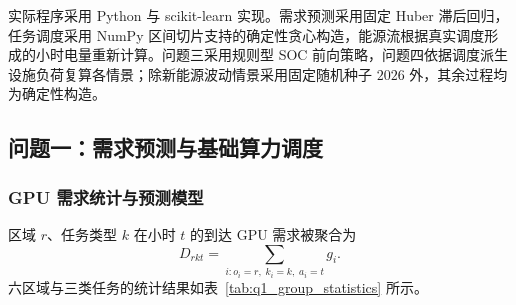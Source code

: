 
实际程序采用 Python 与 scikit-learn 实现。需求预测采用固定 Huber 滞后回归，任务调度采用 NumPy 区间切片支持的确定性贪心构造，能源流根据真实调度形成的小时电量重新计算。问题三采用规则型 SOC 前向策略，问题四依据调度派生设施负荷复算各情景；除新能源波动情景采用固定随机种子 $2026$ 外，其余过程均为确定性构造。

\subsection{问题一：需求预测与基础算力调度}

\subsubsection{GPU 需求统计与预测模型}

区域 $r$、任务类型 $k$ 在小时 $t$ 的到达 GPU 需求被聚合为
\begin{equation}
D_{rkt}=\sum_{i:o_i=r,\;k_i=k,\;a_i=t}g_i.
\end{equation}
六区域与三类任务的统计结果如表~\ref{tab:q1_group_statistics} 所示。

